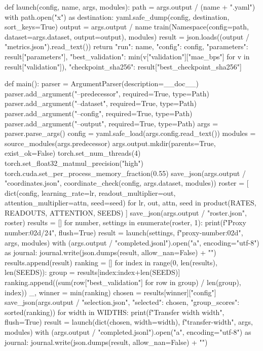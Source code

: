 \documentclass[11pt,oneside,openany]{book}
\begin{document}
\begin{BookCode}
def launch(config, name, args, modules):
    path = args.output / (name + ".yaml")
    with path.open("x") as destination:
        yaml.safe_dump(config, destination, sort_keys=True)
    output = args.output / name
    train(Namespace(config=path, dataset=args.dataset, output=output), modules)
    result = json.loads((output / "metrics.json").read_text())
    return {"run": name, "config": config, "parameters": result["parameters"],
            "best_validation": min(v["validation"]["mae_bps"] for v in result["validation"]),
            "checkpoint_sha256": result["best_checkpoint_sha256"]}
\end{BookCode}
\begin{BookCode}
def main():
    parser = ArgumentParser(description=__doc__)
    parser.add_argument("--predecessor", required=True, type=Path)
    parser.add_argument("--dataset", required=True, type=Path)
    parser.add_argument("--config", required=True, type=Path)
    parser.add_argument("--output", required=True, type=Path)
    args = parser.parse_args()
    config = yaml.safe_load(args.config.read_text())
    modules = source_modules(args.predecessor)
    args.output.mkdir(parents=True, exist_ok=False)
    torch.set_num_threads(4)
    torch.set_float32_matmul_precision("high")
    torch.cuda.set_per_process_memory_fraction(0.55)
    save_json(args.output / "coordinates.json", coordinate_check(config, args.dataset, modules))
    roster = [
        dict(config, learning_rate=lr, readout_multiplier=out, attention_multiplier=attn, seed=seed)
        for lr, out, attn, seed in product(RATES, READOUTS, ATTENTION, SEEDS)
    ]
    save_json(args.output / "roster.json", roster)
    results = []
    for number, settings in enumerate(roster, 1):
        print(f"Proxy {number:02d}/24", flush=True)
        result = launch(settings, f"proxy-{number:02d}", args, modules)
        with (args.output / "completed.jsonl").open("a", encoding="utf-8") as journal:
            journal.write(json.dumps(result, allow_nan=False) + "\n")
        results.append(result)
    ranking = []
    for index in range(0, len(results), len(SEEDS)):
        group = results[index:index+len(SEEDS)]
        ranking.append((sum(row["best_validation"] for row in group) / len(group), index))
    _, winner = min(ranking)
    chosen = results[winner]["config"]
    save_json(args.output / "selection.json", {"selected": chosen, "group_scores": sorted(ranking)})
    for width in WIDTHS:
        print(f"Transfer width {width}", flush=True)
        result = launch(dict(chosen, width=width), f"transfer-{width}", args, modules)
        with (args.output / "completed.jsonl").open("a", encoding="utf-8") as journal:
            journal.write(json.dumps(result, allow_nan=False) + "\n")
\end{BookCode}
\end{document}
